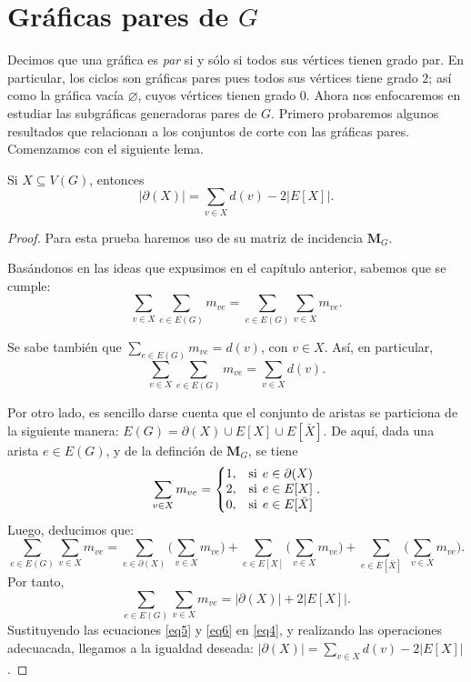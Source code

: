 \section{Gráficas pares de $G$}
Decimos que una gráfica es \textit{par} si y sólo si todos sus vértices tienen grado par. En particular, los ciclos son gráficas pares pues todos sus vértices tiene grado $2$; así como la gráfica vacía $\varnothing$, cuyos vértices tienen grado $0$. Ahora nos enfocaremos en estudiar las subgráficas generadoras pares de $G$. Primero probaremos algunos resultados que relacionan a los conjuntos de corte con las gráficas pares.  Comenzamos con el siguiente lema.

\begin{lema} \label{lema1}
Si $X \subseteq V(G)$, entonces
$$
\big|\partial(X)\big|= \sum _{v \in X} d(v)- 2 \big |E[X]\big |.
$$
\end{lema}

\begin{proof} Para esta prueba haremos uso de su matriz de incidencia $\mathbf{M}_{G}$.

Basándonos en las ideas que expusimos en el capítulo anterior, sabemos que se cumple:
\begin{equation} \label{eq4}
\sum_{v \in X} \sum_{e \in E(G)} m_{ve} = \sum_{e \in E(G)} \sum_{v \in X} m_{ve}.
\end{equation}

Se sabe también que $\sum_{e \in E(G)} m_{ve} = d(v)$, con $v \in X$. Así, en particular, 
\begin{equation} \label{eq5}
    \sum_{v \in X} \sum_{e \in E(G)} m_{ve} =\sum_{v \in X} d(v).
\end{equation}

Por otro lado, es sencillo darse cuenta que el conjunto de aristas se particiona de la siguiente manera: $E(G)=\partial(X) \cup E[X] \cup E[\bar{X}]$. De aquí, dada una arista $e \in E(G)$, y de la definción de $\mathbf{M}_{G}$, se tiene
 $$
  \sum_{v \in X} m_{ve} = \left\{\begin{matrix}
1, & \text{si} \hspace{1.5mm} e \in \partial(X) \\ 
2, & \text{si} \hspace{1.5mm} e \in E[X]        \\
0, & \text{si} \hspace{1.5mm} e \in E[\bar{X}]
\end{matrix}\right..
 $$
 Luego, deducimos que:
  $$
  \sum_{e \in E(G)} \sum_{v \in X} m_{ve} = \sum_{e \in \partial(X)} \big( \sum_{v \in X} m_{ve} \big) + \sum_{e \in E[X]} \big(\sum_{v \in X} m_{ve}\big) + \sum_{e \in E[\bar{X}]} \big(\sum_{v \in X} m_{ve}\big).
  $$
  Por tanto, 
  \begin{equation} \label{eq6}
      \sum_{e \in E(G)} \sum_{v \in X} m_{ve} = \big| \partial(X) \big| + 2 \big| E[X] \big|.
  \end{equation}
  Sustituyendo las ecuaciones \ref{eq5} y \ref{eq6} en \ref{eq4}, y realizando las operaciones adecuacada, llegamos a la igualdad deseada: $\big|\partial(X)\big|= \sum _{v \in X} d(v)- 2 \big |E[X]\big |$.
  
  
\end{proof}

